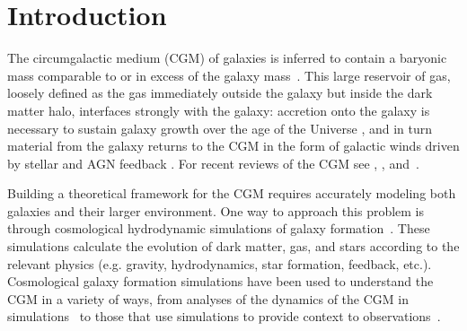 \documentclass[fleqn,usenatbib]{mnras}
\begin{document}

\section{Introduction}

The circumgalactic medium (CGM) of galaxies is inferred to contain a baryonic mass comparable to or in excess of the galaxy mass~\citep[e.g.][]{Werk2014,Tumlinson2017}.
This large reservoir of gas, loosely defined as the gas immediately outside the galaxy but inside the dark matter halo, interfaces strongly with the galaxy:
accretion onto the galaxy is necessary to sustain galaxy growth over the age of the Universe \citep[e.g.][]{Prochaska2009, Bauermeister2010},
and in turn material from the galaxy returns to the CGM in the form of galactic winds driven by stellar and AGN feedback \citep[e.g.,][]{Heckman2000, Steidel2010, Jones2012, Rubin2014, Cicone2014}.
For recent reviews of the CGM see \cite{Putman2012}, \cite{Tumlinson2017}, and~\cite{Fox2017}.

Building a theoretical framework for the CGM requires accurately modeling both galaxies and their larger environment.
One way to approach this problem is through cosmological hydrodynamic simulations of galaxy formation~\citep[e.g.][]{Somerville2015}.
These simulations calculate the evolution of dark matter, gas, and stars according to the relevant physics (e.g. gravity, hydrodynamics, star formation, feedback, etc.). 
Cosmological galaxy formation simulations have been used to understand the CGM in a variety of ways, from analyses of the dynamics of the CGM in simulations~\citep[e.g.][]{Keres2005, Keres2009, Faucher-Giguere2011a, 2011MNRAS.414.2458V, Nelson2013, Oppenheimer2010, Wetzel2015, Oppenheimer2018} to those that use simulations to provide context to observations~\citep[e.g.][]{Faucher-Giguere2010, Faucher-Giguere2011,Hummels2013,Liang2015,Corlies2016, 2016MNRAS.462.2440T, Gutcke2017, Nelson2017, Roca-Fabrega2018}.
\end{document}
